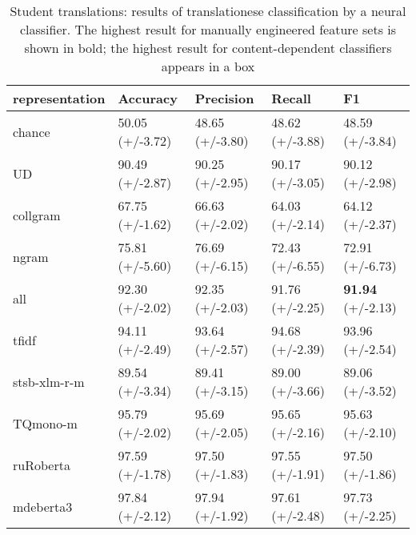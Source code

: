 \begin{table}[H]
	\centering
	\begin{tabular}{l|llll}
		\toprule
		representation & Accuracy        & Precision       & Recall          & F1              \\
		\midrule
		chance          & 50.05 (+/-3.72) & 48.65 (+/-3.80) & 48.62 (+/-3.88) & 48.59 (+/-3.84) \\
		\midrule
		UD              & 90.49 (+/-2.87) & 90.25 (+/-2.95) & 90.17 (+/-3.05) & 90.12 (+/-2.98) \\
		collgram        & 67.75 (+/-1.62) & 66.63 (+/-2.02) & 64.03 (+/-2.14) & 64.12 (+/-2.37) \\
		ngram           & 75.81 (+/-5.60) & 76.69 (+/-6.15) & 72.43 (+/-6.55) & 72.91 (+/-6.73) \\
		all             & 92.30 (+/-2.02) & 92.35 (+/-2.03) & 91.76 (+/-2.25) & \textbf{91.94} (+/-2.13) \\
		\midrule
		tfidf           & 94.11 (+/-2.49) & 93.64 (+/-2.57) & 94.68 (+/-2.39) & 93.96 (+/-2.54) \\
		stsb-xlm-r-m   & 89.54 (+/-3.34) & 89.41 (+/-3.15) & 89.00 (+/-3.66) & 89.06 (+/-3.52) \\
		TQmono-m & 95.79 (+/-2.02) & 95.69 (+/-2.05) & 95.65 (+/-2.16) & 95.63 (+/-2.10) \\
		ruRoberta & 97.59 (+/-1.78) & 97.50 (+/-1.83) & 97.55 (+/-1.91) & 97.50 (+/-1.86) \\
		mdeberta3  & 97.84 (+/-2.12) & 97.94 (+/-1.92) & 97.61 (+/-2.48) & \boxit{0.4in}97.73 (+/-2.25) \\
	\bottomrule
	\end{tabular}
	\caption{\label{tab:stu-ref_neu}Student translations: results of translationese classification  by a neural classifier. The highest result for manually engineered feature sets is shown in bold; the highest result for content-dependent classifiers appears in a box}
\end{table}



